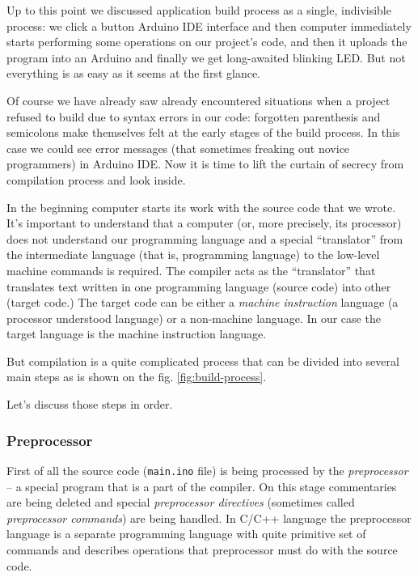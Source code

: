 \documentclass[../sparc.tex]{subfiles}
\begin{document}

Up to this point we discussed application build process as a single, indivisible
process: we click a button Arduino IDE interface and then computer immediately
starts performing some operations on our project's code, and then it uploads the
program into an Arduino and finally we get long-awaited blinking LED.  But not
everything is as easy as it seems at the first glance.

Of course we have already saw already encountered situations when a project
refused to build due to syntax errors in our code: forgotten parenthesis and
semicolons make themselves felt at the early stages of the build process.  In
this case we could see error messages (that sometimes freaking out novice
programmers) in Arduino IDE.  Now it is time to lift the curtain of secrecy from
compilation process and look inside.

In the beginning computer starts its work with the source code that we wrote.
It's important to understand that a computer (or, more precisely, its processor)
does not understand our programming language and a special ``translator'' from
the intermediate language (that is, programming language) to the low-level
machine commands is required.  The \gls{compiler} acts as the ``translator''
that translates text written in one programming language (source code) into
other (target code.)  The target code can be either a \emph{machine instruction}
language (a processor understood language) or a non-machine language.  In our
case the target language is the machine instruction language.

But compilation is a quite complicated process that can be divided into several
main steps as is shown on the fig. \ref{fig:build-process}.


Let's discuss those steps in order.

\subsubsection{Preprocessor}

First of all the source code (\texttt{main.ino} file) is being processed by the
\emph{preprocessor} -- a special program that is a part of the compiler.  On this
stage commentaries are being deleted and special \emph{preprocessor directives}
(sometimes called \emph{preprocessor commands}) are being handled.  In C/C++
language the preprocessor language is a separate programming language with quite
primitive set of commands and describes operations that preprocessor must do
with the source code.
\end{document}

